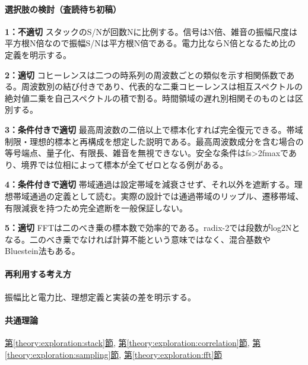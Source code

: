 \paragraph{選択肢の検討（査読待ち初稿）}\mbox{}\par

\noindent\textbf{1：不適切} スタックのS/Nが回数Nに比例する。信号はN倍、雑音の振幅尺度は平方根N倍なので振幅S/Nは平方根N倍である。電力比ならN倍となるため比の定義を明示する。\par

\noindent\textbf{2：適切} コヒーレンスは二つの時系列の周波数ごとの類似を示す相関係数である。周波数別の結び付きであり、代表的な二乗コヒーレンスは相互スペクトルの絶対値二乗を自己スペクトルの積で割る。時間領域の遅れ別相関そのものとは区別する。\par

\noindent\textbf{3：条件付きで適切} 最高周波数の二倍以上で標本化すれば完全復元できる。帯域制限・理想的標本と再構成を想定した説明である。最高周波数成分を含む場合の等号端点、量子化、有限長、雑音を無視できない。安全な条件はfs>2fmaxであり、境界では位相によって標本が全てゼロとなる例がある。\par

\noindent\textbf{4：条件付きで適切} 帯域通過は設定帯域を減衰させず、それ以外を遮断する。理想帯域通過の定義として読む。実際の設計では通過帯域のリップル、遷移帯域、有限減衰を持つため完全遮断を一般保証しない。\par

\noindent\textbf{5：適切} FFTは二のべき乗の標本数で効率的である。radix-2では段数がlog2Nとなる。二のべき乗でなければ計算不能という意味ではなく、混合基数やBluestein法もある。\par

\paragraph{再利用する考え方} 振幅比と電力比、理想定義と実装の差を明示する。

\paragraph{共通理論} \hyperref[theory:exploration:stack]{第\ref*{theory:exploration:stack}節}, \hyperref[theory:exploration:correlation]{第\ref*{theory:exploration:correlation}節}, \hyperref[theory:exploration:sampling]{第\ref*{theory:exploration:sampling}節}, \hyperref[theory:exploration:fft]{第\ref*{theory:exploration:fft}節}

